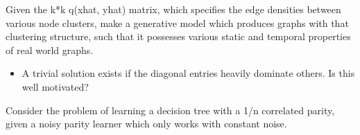 Given the k*k q(xhat, yhat) matrix, which specifies the edge densities between various node clusters, make a generative model which produces graphs with that clustering structure, such that it possesses various static and temporal properties of real world graphs.

\begin{itemize}
\item A trivial solution exists if the diagonal entries heavily dominate others. Is this well motivated?
\end{itemize}

Consider the problem of learning a decision tree with a 1/n correlated parity, given a noisy parity learner which only works with constant noise.

